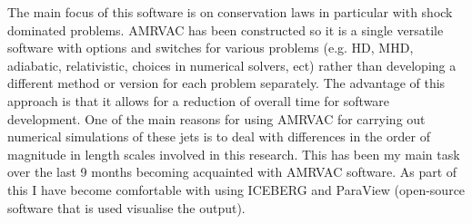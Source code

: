 \documentclass[12pt]{ociamthesis}
\begin{document}
The main focus of this software is on conservation laws in particular with shock dominated problems. AMRVAC has been constructed so it is a single versatile software with options and switches for various problems (e.g. HD, MHD, adiabatic, relativistic, choices in numerical solvers, ect) rather than developing a different method or version for each problem separately. The advantage of this approach is that it allows for a reduction of overall time for software development. One of the main reasons for using AMRVAC for carrying out numerical simulations of these jets is to deal with differences in the order of magnitude in length scales involved in this research. This has been my main task over the last 9 months becoming acquainted with AMRVAC software. As part of this I have become comfortable with using ICEBERG and ParaView (open-source software that is used visualise the output).
\end{document}
